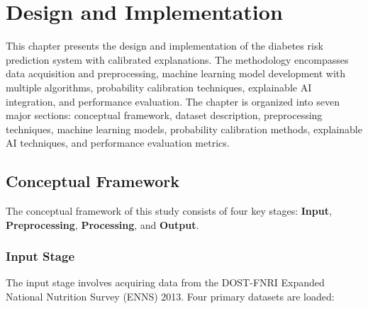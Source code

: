 \section{Design and Implementation}

This chapter presents the design and implementation of the diabetes risk prediction system with calibrated explanations. The methodology encompasses data acquisition and preprocessing, machine learning model development with multiple algorithms, probability calibration techniques, explainable AI integration, and performance evaluation. The chapter is organized into seven major sections: conceptual framework, dataset description, preprocessing techniques, machine learning models, probability calibration methods, explainable AI techniques, and performance evaluation metrics.

\subsection{Conceptual Framework}


The conceptual framework of this study consists of four key stages: \textbf{Input}, \textbf{Preprocessing}, \textbf{Processing}, and \textbf{Output}.

\subsubsection{Input Stage}

The input stage involves acquiring data from the DOST-FNRI Expanded National Nutrition Survey (ENNS) 2013. Four primary datasets are loaded:

